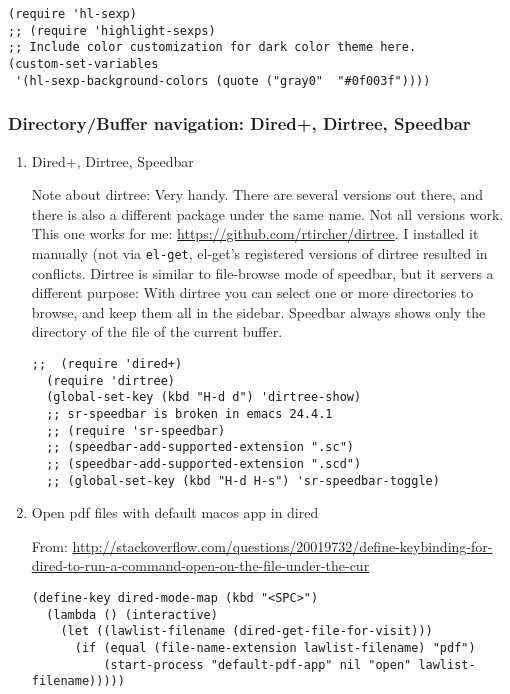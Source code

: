 \documentclass{article}
\begin{document}
\begin{verbatim}
(require 'hl-sexp)
;; (require 'highlight-sexps)
;; Include color customization for dark color theme here.
(custom-set-variables
 '(hl-sexp-background-colors (quote ("gray0"  "#0f003f"))))
\end{verbatim}

\subsubsection{Directory/Buffer navigation: Dired+, Dirtree, Speedbar}
\label{sec-1-11-18}
\begin{enumerate}
\item Dired+, Dirtree, Speedbar
\label{sec-1-11-18-1}

Note about dirtree:  Very handy.  There are several versions out there, and there is also a different package under the same name.  Not all versions work.  This one works for me: \url{https://github.com/rtircher/dirtree}.  I installed it manually (not via \texttt{el-get}, el-get's registered versions of dirtree resulted in conflicts.  Dirtree is similar to file-browse mode of speedbar, but it servers a different purpose: With dirtree you can select one or more directories to browse, and keep them all in the sidebar.  Speedbar always shows only the directory of the file of the current buffer.

\begin{verbatim}
;;  (require 'dired+)
  (require 'dirtree)
  (global-set-key (kbd "H-d d") 'dirtree-show)
  ;; sr-speedbar is broken in emacs 24.4.1
  ;; (require 'sr-speedbar)
  ;; (speedbar-add-supported-extension ".sc")
  ;; (speedbar-add-supported-extension ".scd")
  ;; (global-set-key (kbd "H-d H-s") 'sr-speedbar-toggle)
\end{verbatim}

\item Open pdf files with default macos app in dired
\label{sec-1-11-18-2}

From: \url{http://stackoverflow.com/questions/20019732/define-keybinding-for-dired-to-run-a-command-open-on-the-file-under-the-cur}

\begin{verbatim}
(define-key dired-mode-map (kbd "<SPC>")
  (lambda () (interactive)
    (let ((lawlist-filename (dired-get-file-for-visit)))
      (if (equal (file-name-extension lawlist-filename) "pdf")
          (start-process "default-pdf-app" nil "open" lawlist-filename)))))
\end{verbatim}
\end{enumerate}
\end{document}
